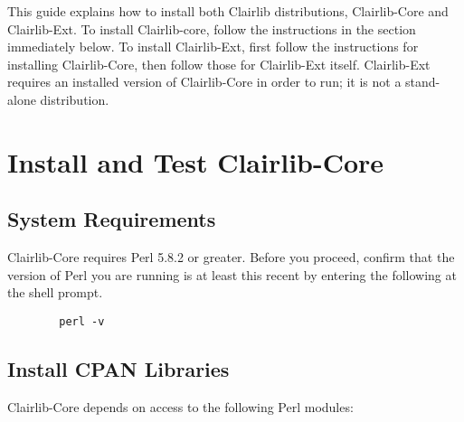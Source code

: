 

This guide explains how to install both Clairlib distributions, Clairlib-Core and Clairlib-Ext. To install Clairlib-core, follow the instructions in the section immediately below. To install Clairlib-Ext, first follow the instructions for installing
Clairlib-Core, then follow those for Clairlib-Ext itself. Clairlib-Ext requires an installed version of Clairlib-Core in order to run; it is not a stand-alone distribution.

\section{Install and Test Clairlib-Core\label{Install_and_Test_Clairlib-Core}}
\subsection*{System Requirements\label{System_Requirements}}


Clairlib-Core requires Perl 5.8.2 or greater. Before you proceed, confirm that the version of Perl you are running is at least this recent by entering the following at the shell prompt.

\begin{verbatim}
        perl -v
\end{verbatim}
\subsection*{Install CPAN Libraries\label{Install_CPAN_Libraries}}


Clairlib-Core depends on access to the following Perl modules:

